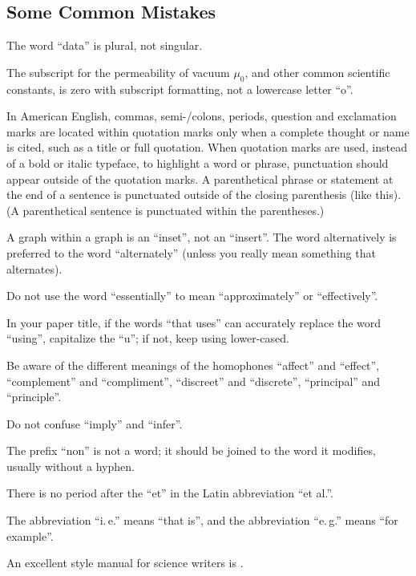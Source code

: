 \documentclass[conference,flushend]{iaria-lite}
\begin{document}
\subsection{Some Common Mistakes}

\begin{compactitem}
\item The word “data” is plural, not singular.
\item The subscript for the permeability of vacuum $\mu_0$, and other common scientific constants, is zero with subscript formatting, not a lowercase letter “o”.
\item In American English, commas, semi-/colons, periods, question and exclamation marks are located within quotation marks only when a complete thought or name is cited, such as a title or full quotation. When quotation marks are used, instead of a bold or italic typeface, to highlight a word or phrase, punctuation should appear outside of the quotation marks. A parenthetical phrase or statement at the end of a sentence is punctuated outside of the closing parenthesis (like this). (A parenthetical sentence is punctuated within the parentheses.)
\item A graph within a graph is an “inset”, not an “insert”. The word alternatively is preferred to the word “alternately” (unless you really mean something that alternates).
\item Do not use the word “essentially” to mean “approximately” or “effectively”.
\item In your paper title, if the words “that uses” can accurately replace the word “using”, capitalize the “u”; if not, keep using lower-cased.
\item Be aware of the different meanings of the homophones “affect” and “effect”, “complement” and “compliment”, “discreet” and “discrete”, “principal” and “principle”.
\item Do not confuse “imply” and “infer”.
\item The prefix “non” is not a word; it should be joined to the word it modifies, usually without a hyphen.
\item There is no period after the “et” in the Latin abbreviation “et al.”.
\item The abbreviation “i.\,e.” means “that is”, and the abbreviation “e.\,g.” means “for example”.
\end{compactitem}

An excellent style manual for science writers is \cite{young2002technical}.
\end{document}

